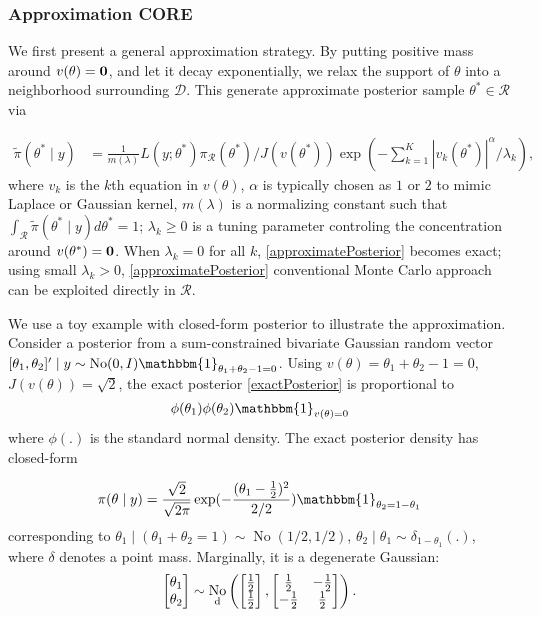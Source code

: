 \documentclass[10pt,fleqn]{article}
\newcommand{\be}{\begin{equation}\begin{aligned}}
\newcommand{\ee}{\end{aligned}\end{equation}}
\newcommand{\mc}[1]{\mathcal{#1}}
\DeclareMathOperator{\No}{No}
\DeclareMathOperator{\1}{\mathbbm{1}}
\begin{document}
 \subsubsection{Approximation CORE}

We first present a general approximation strategy. By putting positive mass around $v(\theta)=\bf
0$, and let it decay exponentially, we relax the support of $\theta$ into a
neighborhood surrounding $\mc D $. This generate approximate posterior sample $\theta^*\in \mc R$ via

\be
\label{approximatePosterior}
\tilde{\pi}(\theta^*\mid y)  & = \frac{1}{m(\lambda)} L(y;\theta^*) \pi_{\mc
R}(\theta^*) /J(v(\theta^*)) \exp (- \sum_{k=1}^K |v_k(\theta^*)|^\alpha/\lambda_k),
\ee
where $v_k$ is the $k$th equation in $v(\theta)$, $\alpha$ is
typically chosen as $1$ or $2$ to mimic Laplace or Gaussian kernel, $m(\lambda)$ is a normalizing
constant such that $\int_{\mc R} \tilde{\pi}(\theta^*\mid y) d\theta^*=1$;
 $\lambda_k\ge 0$ is a
tuning parameter controling the concentration around $v(\theta^*)=\bf 0$.
When $\lambda_k=0$ for all $k$, 
\eqref{approximatePosterior} becomes exact; using small $\lambda_k>0$, \eqref{approximatePosterior}
 conventional Monte Carlo approach can be exploited directly in $\mc R$.

We use a toy example with closed-form posterior to illustrate the  approximation. Consider a posterior from a sum-constrained
bivariate Gaussian random vector $[\theta_1,\theta_2]' \mid y \sim \No(0,I)
\mathbbm{1}_{\theta_1+\theta_2-1=0}$. Using
$v(\theta)=\theta_1+\theta_2-1=0$, $J(v(\theta))=\sqrt 2$, the exact posterior \eqref{exactPosterior} is proportional to 
$$
\phi(\theta_1)
\phi(\theta_2)\mathbbm{1}_{v(\theta)=0}
$$
where $\phi(.)$ is the standard
normal density. The exact posterior density has closed-form

$$
\pi(\theta\mid y)=\frac{\sqrt{2}}{\sqrt{2\pi}} \exp(-\frac{(\theta_1-\frac{1}{2})^2}{2/2})
\mathbbm{1}_{\theta_2=1-\theta_1}
$$
corresponding to $\theta_1\mid (\theta_1+ \theta_2=1) \sim
\No(1/2,1/2)$, $\theta_2\mid \theta_1 \sim \delta_{1-\theta_1}(.)$, where
$\delta$ denotes a point mass. Marginally, it is a degenerate Gaussian:
$$\begin{bmatrix} \theta_1 \\ \theta_2 \end{bmatrix} \sim
\No_{\text d} \left(
\begin{bmatrix} \frac{1}{2} \\ \frac{1}{2} \end{bmatrix},
\begin{bmatrix} \frac{1}{2} & -\frac{1}{2}  \\  -\frac{1}{2}  & \frac{1}{2} \end{bmatrix}
\right).$$
\end{document}
